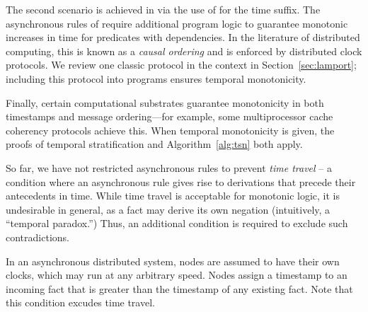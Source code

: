 The second scenario is achieved in \slang via the use of  for the time suffix. The asynchronous rules of \lang require additional program logic to guarantee monotonic increases in time for predicates with dependencies.  In the literature of distributed computing, this is known as a {\em causal ordering} and is enforced by distributed clock protocols.  We review one classic protocol in the \lang context in Section~\ref{sec:lamport}; including this protocol into \lang programs ensures temporal monotonicity.

Finally, certain computational substrates guarantee monotonicity in both timestamps and message ordering---for example, some multiprocessor cache coherency protocols achieve this.  When temporal monotonicity is given, the proofs of temporal stratification and Algorithm~\ref{alg:tsn} both apply.

So far, we have not restricted asynchronous rules to prevent {\em time travel} -- a condition where an asynchronous rule gives rise to derivations that precede their antecedents in time.  While time travel is acceptable for monotonic logic, it is undesirable in general, as a fact may derive its own negation (intuitively, a ``temporal paradox.'')  Thus, an additional condition is required to exclude such contradictions.

In an asynchronous distributed system, nodes are assumed to have their own clocks, which may run at any arbitrary speed.  Nodes assign a timestamp to an incoming fact that is greater than the timestamp of any existing fact.  Note that this condition excudes time travel.



